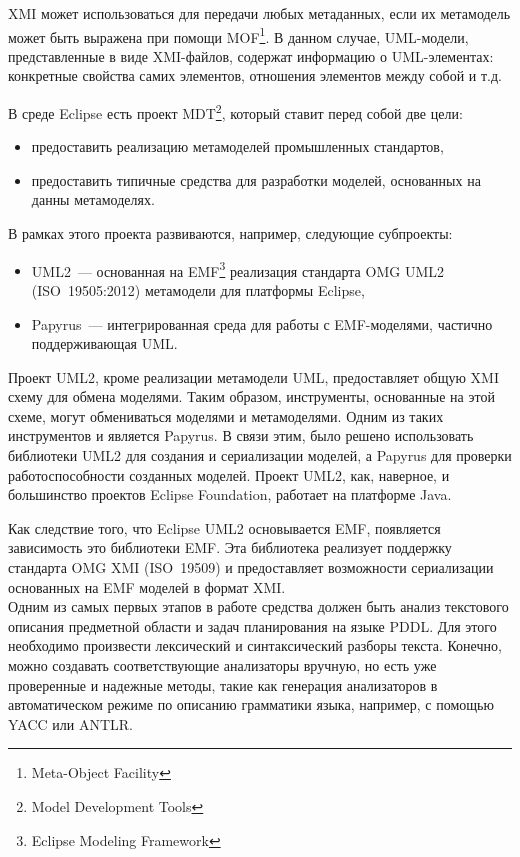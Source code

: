 XMI может использоваться для передачи любых метаданных, если их метамодель может быть выражена при помощи MOF\footnote{Meta-Object Facility}.
В данном случае, UML-модели, представленные в виде XMI-файлов, содержат информацию о UML-элементах: конкретные свойства самих элементов, отношения элементов между собой и т.д. 

В среде Eclipse есть проект MDT\footnote{Model Development Tools}, который ставит перед собой две цели:
\begin{itemize}
    \item
    предоставить реализацию метамоделей промышленных стандартов,

    \item
    предоставить типичные средства для разработки моделей, основанных на данны метамоделях.
\end{itemize}

В рамках этого проекта развиваются, например, следующие субпроекты:
\begin{itemize}
    \item UML2~--- основанная на EMF\footnote{Eclipse Modeling Framework} реализация стандарта OMG UML2 (ISO~19505:2012) метамодели для платформы Eclipse,

    \item Papyrus~--- интегрированная среда для работы с EMF-моделями, частично поддерживающая UML.
\end{itemize}

Проект UML2, кроме реализации метамодели UML, предоставляет общую XMI схему для обмена моделями. Таким образом, инструменты, основанные на этой схеме, могут обмениваться моделями и метамоделями. Одним из таких инструментов и является Papyrus. 
В связи этим, было решено использовать библиотеки UML2 для создания и сериализации моделей, а Papyrus для проверки работоспособности созданных моделей. Проект UML2, как, наверное, и большинство проектов Eclipse Foundation, работает на платформе Java. 

Как следствие того, что Eclipse UML2 основывается EMF, появляется зависимость это библиотеки EMF. Эта библиотека реализует поддержку стандарта OMG XMI (ISO~19509) и предоставляет возможности сериализации основанных на EMF моделей в формат XMI. 
\\

Одним из самых первых этапов в работе средства должен быть анализ текстового описания предметной области и задач планирования на языке PDDL. Для этого необходимо произвести лексический и синтаксический разборы текста. Конечно, можно создавать соответствующие анализаторы вручную, но есть уже проверенные и надежные методы, такие как генерация анализаторов в автоматическом режиме по описанию грамматики языка, например, с помощью YACC или ANTLR.

